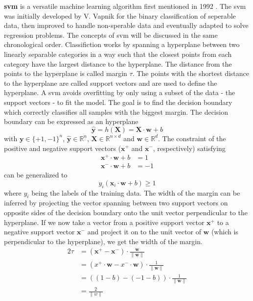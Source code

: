 \textbf{\Gls{svm}} is a versatile machine learning algorithm first mentioned in 1992\cite{boser1992training} . 
%
The \gls{svm} was initially developed by V. Vapnik for the binary classification of seperable data, then improved to handle non-sperable data and eventually adapted to solve regression problems.
The concepts of \gls{svm} will be discussed in the same chronological order. 
%
Classifiction works by spanning a hyperplane between two linearly separable categories in a way such that the closest points from each category have the largest distance to the hyperplane. 
The distance from the points to the hyperplane is called margin $\tau$.
The points with the shortest distance to the hyperplane are called support vectors and are used to define the hyperplane.
A \gls{svm} avoids overfitting by only using a subset of the data - the support vectors - to fit the model. 
The goal is to find the decision boundary which correctly classifies all samples with the biggest margin. 
%
The decision boundary can be expressed as an hyperplane
\begin{equation}
	\hat{\mathbf{y}} = h(\mathbf{X}) = \mathbf{X} \cdot \mathbf{w} + b
\end{equation}
with 
$\mathbf{y} \in \lbrace +1, -1 \rbrace^n$, 
$\hat{\mathbf{y}} \in \mathbb{R}^n$,
$\mathbf{X} \in \mathbb{R}^{n \times d}$ and
$\mathbf{w} \in \mathbb{R}^d$.
The constraint of the positive and negative support vectors ($\mathbf{x}^+$ and $\mathbf{x}^-$, respectively) satisfying
\begin{align}
	\mathbf{x}^+ \cdot \mathbf{w} + b &= 1 \\
	\mathbf{x}^- \cdot \mathbf{w} + b &= -1 
\end{align}
can be generalized to 
\begin{equation}
	\label{eq:svm01}
	y_i(\mathbf{x}_i \cdot \mathbf{w} + b ) \geqslant 1 %
\end{equation}
where $y_i$ being the labels of the training data. 
The width of the margin can be inferred by projecting the vector spanning between two support vectors 
on opposite sides of the decision boundary onto the unit vector perpendicular to the hyperplane. 
If we now take a vector from a positive support vector $\mathbf{x}^+$ to a negative support vector $\mathbf{x}^-$ and project it on to the unit vector of $\mathbf{w}$ (which is perpendicular to the hyperplane), 
we get the width of the margin. 
\iffalse
\begin{equation}
	\label{eq:svm02}
	\begin{aligned} 
		2\tau &= (\mathbf{x}^+ - \mathbf{x}^-) \cdot \frac{\mathbf{w}}{\|\mathbf{w}\|} \\
			&= (x^+ \cdot \mathbf{w} - x^-\cdot \mathbf{w} ) \cdot \frac{1}{\|\mathbf{w}\|} \\
			&= ( (1-b) - (-1-b) ) \cdot \frac{1}{\|\mathbf{w}\|} \\
			&= \frac{2}{\|w\|}
	\end{aligned}
\end{equation}
